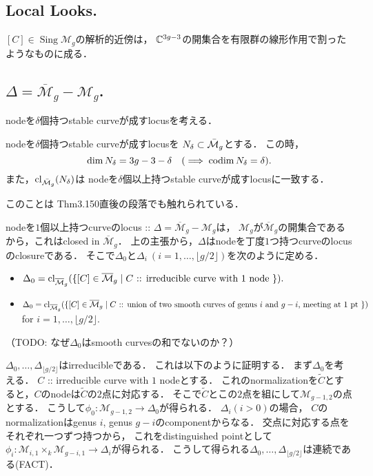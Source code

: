 \documentclass[a4paper]{jsarticle}
\newcommand{\tp}[2]{\texorpdfstring{#1}{#2}}
\newcommand{\M}{\mathcal{M}}
\newcommand{\barM}{\overline{\mathcal{M}}}
\newcommand{\Sing}{\operatorname{Sing}}
\begin{document}
    \subsection{Local Looks.}
    $[C] \in \Sing \M_g$の解析的近傍は，
    $\mathbb{C}^{3g-3}$の開集合を有限群の線形作用で割ったようなものに成る．

    \subsection{\tp{$\Delta=\barM_g-\M_g$}{D=barMg-Mg}.}
        nodeを$\delta$個持つstable curveが成すlocusを考える．
        \begin{Claim}
            nodeを$\delta$個持つstable curveが成すlocusを
            $N_{\delta} \subset \bar{\mathcal{M}}_g$とする．
            この時，
            \[ \dim N_{\delta}=3g-3-\delta \quad (\implies \operatorname{codim} N_{\delta}=\delta). \]
            また，$\operatorname{cl}_{\bar{\mathcal{M}}_g}(N_{\delta})$は
            nodeを$\delta$個以上持つstable curveが成すlocusに一致する．
        \end{Claim}
        このことは\cite{HaMo} Thm3.150直後の段落でも触れられている．

        nodeを$1$個以上持つcurveのlocus :: $\Delta=\barM_g-\M_g$は，
        $\M_g$が$\barM_g$の開集合であるから，これはclosed in $\barM_g$．
        上の主張から，$\Delta$はnodeを丁度$1$つ持つcurveのlocusのclosureである．
        そこで$\Delta_0$と$\Delta_i \ (i=1,\dots,\lfloor g/2\rfloor)$を次のように定める．
        \begin{itemize}
            \item $\Delta_0=\cl_{\barM_g}(\{ [C] \in \barM_g \mid
                    C \text{ :: irreducible curve with $1$ node } \}).$
            \item $\Delta_0=\cl_{\barM_g}(\{ [C] \in \barM_g \mid
                    C \text{ :: union of two smooth curves of genus $i$ and $g-i$, meeting at $1$ pt } \})$
                    for $i=1,\dots,\lfloor g/2\rfloor.$
        \end{itemize}
        （TODO: なぜ$\Delta_0$はsmooth curvesの和でないのか？）

        $\Delta_0,\dots,\Delta_{\lfloor g/2 \rfloor}$はirreducibleである．
        これは以下のように証明する．
        まず$\Delta_0$を考える．
        $C$ :: irreducible curve with $1$ nodeとする．
        これのnormalizationを$\tilde{C}$とすると，$C$のnodeは$\tilde{C}$の$2$点に対応する．
        そこで$\tilde{C}$とこの$2$点を組にして$\M_{g-1,2}$の点とする．
        こうして$\phi_0: \M_{g-1, 2} \to \Delta_0$が得られる．
        $\Delta_i (i>0)$の場合，
        $C$のnormalizationはgenus $i$, genus $g-i$のcomponentからなる．
        交点に対応する点をそれぞれ一つずつ持つから，
        これをdistinguished pointとして
        $\phi_i: \M_{i, 1} \times_k \M_{g-i, 1} \to \Delta_i$が得られる．
        こうして得られる$\Delta_0,\dots,\Delta_{\lfloor g/2 \rfloor}$は連続である(FACT)．
        
\end{document}
